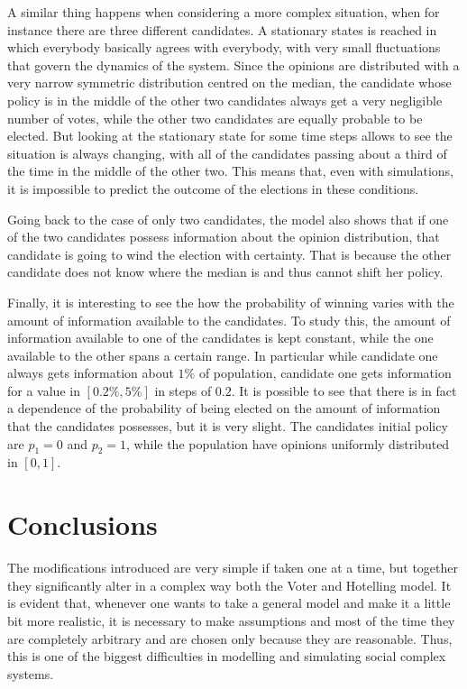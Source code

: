\documentclass[11pt,a4paper,twocolumn]{article}
\begin{document}
A similar thing happens when considering a more complex situation, when for instance there are three different candidates.
A stationary states is reached in which everybody basically agrees with everybody, with very small fluctuations that govern the dynamics of the system. Since the opinions are distributed with a very narrow symmetric distribution centred on the median, the candidate whose policy is in the middle of the other two candidates always get a very negligible number of votes, while the other two candidates are equally probable to be elected. But looking at the stationary state for some time steps allows to see the situation is always changing, with all of the candidates passing about a third of the time in the middle of the other two. This means that, even with simulations, it is impossible to predict the outcome of the elections in these conditions.

Going back to the case of only two candidates, the model also shows that if one of the two candidates possess information about the opinion distribution, that candidate is going to wind the election with certainty. That is because the other candidate does not know where the median is and thus cannot shift her policy.

Finally, it is interesting to see the how the probability of winning varies with the amount of information available to the candidates. To study this, the amount of information available to one of the candidates is kept constant, while the one available to the other spans a certain range. In particular while candidate one always gets information about $1\%$ of population, candidate one gets information for a value in $[0.2\%,5\%]$ in steps of $0.2$. It is possible to see that there is in fact a dependence of the 
probability of being elected on the amount of information that the candidates possesses, but it is very slight.
The candidates initial policy are $p_1=0$ and $p_2=1$, while the population have opinions uniformly distributed in $[0,1]$.

\section*{Conclusions}

The modifications introduced are very simple if taken one at a time, but together they significantly alter in a complex way both the Voter and Hotelling model.
It is evident that, whenever one wants to take a general model and make it a little bit more realistic, it is necessary to make assumptions and most of the time they are completely arbitrary and are chosen only because they are reasonable. Thus, this is one of the biggest difficulties in modelling and simulating social complex systems.
\end{document}
